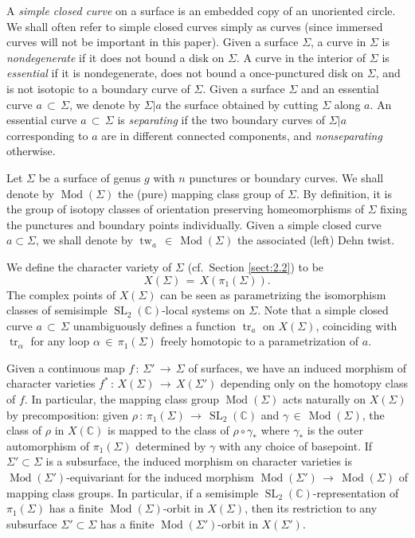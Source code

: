 \documentclass[reqno]{amsart}
\theoremstyle{plain}
\theoremstyle{definition}
\theoremstyle{remark}
\newcommand{\C}{{\mathbb{C}}}
\DeclareMathOperator{\Mod}{Mod}
\DeclareMathOperator{\SL}{SL}
\DeclareMathOperator{\tw}{tw}
\DeclareMathOperator{\tr}{tr}
\begin{document}
A \emph{simple closed curve} on a surface is an embedded copy of an unoriented circle. We shall often refer to 
simple closed curves simply as curves (since immersed curves will not be important in this paper). Given a 
surface $\Sigma$, a curve in $\Sigma$ is \emph{nondegenerate} if it does not bound a disk on $\Sigma$. A curve 
in the interior of $\Sigma$ is \emph{essential} if it is nondegenerate, does not bound a once-punctured disk on 
$\Sigma$, and is not isotopic to a boundary curve of $\Sigma$. Given a surface $\Sigma$ and an essential curve 
$a\,\subset\,\Sigma$, we denote by $\Sigma|a$ the surface obtained by cutting $\Sigma$ along $a$. An essential 
curve $a\,\subset\,\Sigma$ is \emph{separating} if the two boundary curves of $\Sigma|a$ corresponding to $a$ are 
in different connected components, and \emph{nonseparating} otherwise.

Let $\Sigma$ be a surface of genus $g$ with $n$ punctures or boundary curves. We shall denote by $\Mod(\Sigma)$ 
the (pure) mapping class group of $\Sigma$. By definition, it is the group of isotopy classes of orientation 
preserving homeomorphisms of $\Sigma$ fixing the punctures and boundary points individually. Given a simple 
closed curve $a\subset\Sigma$, we shall denote by $\tw_a\,\in\,\Mod(\Sigma)$ the associated (left) Dehn twist.

 We  define the character variety of $\Sigma$ (cf.\ Section \ref{sect:2.2}) to be
$$X(\Sigma)\,=\,X(\pi_1(\Sigma)).$$
The complex points of $X(\Sigma)$ can be seen as parametrizing the isomorphism classes of semisimple 
$\SL_2(\C)$-local systems on $\Sigma$. Note that a simple closed curve $a\,\subset\, \Sigma$ unambiguously defines 
a function $\tr_a$ on $X(\Sigma)$, coinciding with $\tr_\alpha$ for any loop $\alpha\,\in\,\pi_1(\Sigma)$ freely 
homotopic to a parametrization of $a$.

Given a continuous map $f\,:\,\Sigma'\,\to\,\Sigma$ of surfaces, we have an induced morphism of character varieties 
$f^*\,:\,X(\Sigma)\,\to\, X(\Sigma')$ depending only on the homotopy class of $f$. In particular, the mapping class 
group $\Mod(\Sigma)$ acts naturally on $X(\Sigma)$ by precomposition: given $\rho\,:\,\pi_1(\Sigma)\,\to\,\SL_2(\C)$ 
and $\gamma\,\in\, \Mod(\Sigma)$, the class of $\rho$ in $X(\C)$ is mapped to the class of $\rho\circ\gamma_*$ 
where $\gamma_*$ is the outer automorphism of $\pi_1(\Sigma)$ determined by $\gamma$ with any choice of 
basepoint. If $\Sigma'\subset\Sigma$ is a subsurface, the induced morphism on character varieties is 
$\Mod(\Sigma')$-equivariant for the induced morphism $\Mod(\Sigma')\,\to\,\Mod(\Sigma)$ of mapping class groups. In 
particular, if a semisimple $\SL_2(\C)$-representation of $\pi_1(\Sigma)$ has a finite $\Mod(\Sigma)$-orbit in 
$X(\Sigma)$, then its restriction to any subsurface $\Sigma'\subset\Sigma$ has a finite $\Mod(\Sigma')$-orbit 
in $X(\Sigma')$.
\end{document}
